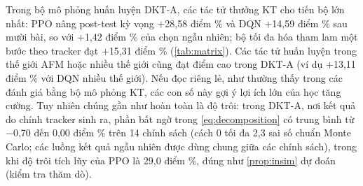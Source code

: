\documentclass[a4paper,preprint,12pt,authoryear]{elsarticle}
\begin{document}
Trong bộ mô phỏng huấn luyện DKT-A, các tác tử thưởng KT cho tiến bộ lớn nhất: PPO nâng post-test kỳ vọng $+$28{,}58 điểm \% và DQN $+$14{,}59 điểm \% sau mười bài, so với $+$1{,}42 điểm \% của chọn ngẫu nhiên; bộ tối đa hóa tham lam một bước theo tracker đạt $+$15{,}31 điểm \% (\cref{tab:matrix}). Các tác tử huấn luyện trong thế giới AFM hoặc nhiều thế giới cũng đạt điểm cao trong DKT-A (ví dụ $+$13{,}11 điểm \% với DQN nhiều thế giới). Nếu đọc riêng lẻ, như thường thấy trong các đánh giá bằng bộ mô phỏng KT, các con số này gợi ý lợi ích lớn của học tăng cường. Tuy nhiên chúng gần như hoàn toàn là độ trôi: trong DKT-A, nơi kết quả do chính tracker sinh ra, phần bất ngờ trong \eqref{eq:decomposition} có trung bình từ $-$0{,}70 đến 0{,}00 điểm \% trên 14 chính sách (cách 0 tối đa 2{,}3 sai số chuẩn Monte Carlo; các luồng kết quả ngẫu nhiên được dùng chung giữa các chính sách), trong khi độ trôi tích lũy của PPO là 29{,}0 điểm \%, đúng như \cref{prop:insim} dự đoán (kiểm tra thăm dò).
\end{document}
